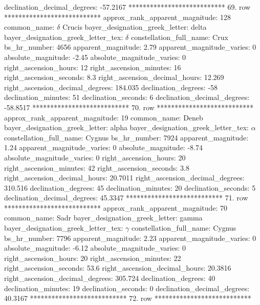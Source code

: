       declination_decimal_degrees: -57.2167
*************************** 69. row ***************************
    approx_rank_apparent_magnitude: 128
                       common_name: $\delta$ Crucis
    bayer_designation_greek_letter: delta
bayer_designation_greek_letter_tex: $\delta$
           constellation_full_name: Crux
                      bs_hr_number: 4656
                apparent_magnitude: 2.79
         apparent_magnitude_varies: 0
                absolute_magnitude: -2.45
         absolute_magnitude_varies: 0
             right_ascension_hours: 12
           right_ascension_minutes: 16
           right_ascension_seconds: 8.3
     right_ascension_decimal_hours: 12.269
   right_ascension_decimal_degrees: 184.035
               declination_degrees: -58
               declination_minutes: 51
               declination_seconds: 6
       declination_decimal_degrees: -58.8517
*************************** 70. row ***************************
    approx_rank_apparent_magnitude: 19
                       common_name: Deneb
    bayer_designation_greek_letter: alpha
bayer_designation_greek_letter_tex: $\alpha$
           constellation_full_name: Cygnus
                      bs_hr_number: 7924
                apparent_magnitude: 1.24
         apparent_magnitude_varies: 0
                absolute_magnitude: -8.74
         absolute_magnitude_varies: 0
             right_ascension_hours: 20
           right_ascension_minutes: 42
           right_ascension_seconds: 3.8
     right_ascension_decimal_hours: 20.7011
   right_ascension_decimal_degrees: 310.516
               declination_degrees: 45
               declination_minutes: 20
               declination_seconds: 5
       declination_decimal_degrees: 45.3347
*************************** 71. row ***************************
    approx_rank_apparent_magnitude: 70
                       common_name: Sadr
    bayer_designation_greek_letter: gamma
bayer_designation_greek_letter_tex: $\gamma$
           constellation_full_name: Cygnus
                      bs_hr_number: 7796
                apparent_magnitude: 2.23
         apparent_magnitude_varies: 0
                absolute_magnitude: -6.12
         absolute_magnitude_varies: 0
             right_ascension_hours: 20
           right_ascension_minutes: 22
           right_ascension_seconds: 53.6
     right_ascension_decimal_hours: 20.3816
   right_ascension_decimal_degrees: 305.724
               declination_degrees: 40
               declination_minutes: 19
               declination_seconds: 0
       declination_decimal_degrees: 40.3167
*************************** 72. row ***************************
